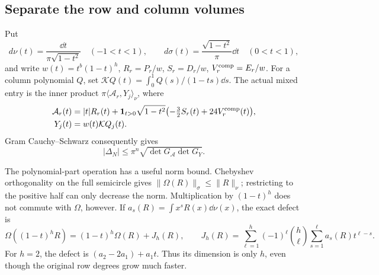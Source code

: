 \subsection{Separate the row and column volumes}

Put
\[
 d\nu(t)=\frac{\dd t}{\pi\sqrt{1-t^2}}\quad(-1<t<1),\qquad
 d\sigma(t)=\frac{\sqrt{1-t^2}}\pi\dd t\quad(0<t<1),
\]
and write $w(t)=t^b(1-t)^h$, $R_r=P_r/w$, $S_r=D_r/w$,
$V_r^{\rm comp}=E_r/w$. For a column polynomial $Q$, set
$\mathcal KQ(t)=\int_0^1Q(s)/(1-ts)\dd s$. The actual mixed entry is
the inner product $\pi\langle\mathcal A_r,Y_j\rangle_\nu$, where
\begin{align*}
 \mathcal A_r(t)&=|t|R_r(t)+\mathbf1_{t>0}\sqrt{1-t^2}
                 \bigl(-\tfrac32S_r(t)+24V_r^{\rm comp}(t)\bigr),\\
 Y_j(t)&=w(t)\mathcal KQ_j(t).
\end{align*}
Gram Cauchy--Schwarz consequently gives
\begin{equation}\label{eq:gram-bound}
 |\Delta_N|\le\pi^n\sqrt{\det G_{\mathcal A}\det G_Y}.
\end{equation}

The polynomial-part operation has a useful norm bound. Chebyshev
orthogonality on the full semicircle gives
$\|\Omega(R)\|_\sigma\le\|R\|_\nu$; restricting to the positive
half can only decrease the norm. Multiplication by $(1-t)^h$ does not
commute with $\Omega$, however. If $a_s(R)=\int x^sR(x)\dd\nu(x)$,
the exact defect is
\begin{equation}\label{eq:commutator}
 \Omega((1-t)^hR)=(1-t)^h\Omega(R)+J_h(R),\qquad
 J_h(R)=\sum_{\ell=1}^h(-1)^\ell\binom h\ell
                         \sum_{s=1}^\ell a_s(R)t^{\ell-s}.
\end{equation}
For $h=2$, the defect is $(a_2-2a_1)+a_1t$. Thus its dimension is
only $h$, even though the original row degrees grow much faster.

